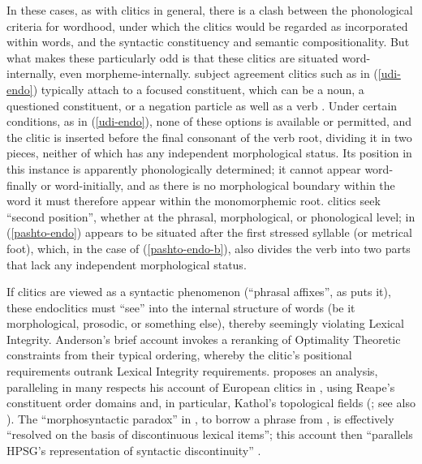 \documentclass[output=paper,biblatex,babelshorthands,newtxmath,draftmode,colorlinks,citecolor=brown]{langscibook}
\begin{document}
In these cases, as with clitics in general, there is a clash between the phonological criteria for wordhood, under which the clitics would be regarded as incorporated within words, and the syntactic constituency and semantic compositionality.
But what makes these particularly odd is that these clitics are situated word-internally, even morpheme-internally.
 subject agreement clitics such as  in (\ref{udi-endo}) typically attach to a focused constituent, which can be a noun, a questioned constituent, or a negation particle as well as a verb \citep{Harris2000}.
Under certain conditions, as in (\ref{udi-endo}), none of these options is available or permitted, and the clitic is inserted before the final consonant of the verb root, dividing it in two pieces, neither of which has any independent morphological status.
Its position in this instance is apparently phonologically determined; it cannot appear word-finally or word-initially, and as there is no morphological boundary within the word it must therefore appear within the monomorphemic root.
 clitics seek ``second position'', whether at the phrasal, morphological, or phonological level;  in (\ref{pashto-endo}) appears to be situated after the first stressed syllable (or metrical foot), which, in the case of (\ref{pashto-endo-b}), also divides the verb into two parts that lack any independent morphological status.

If clitics are viewed as a syntactic phenomenon (``phrasal affixes'', as \citealt{Anderson2005} puts
it), these endoclitics must ``see'' into the internal structure of words (be it morphological,
prosodic, or something else), thereby seemingly violating Lexical
Integrity. Anderson's brief account invokes a reranking of Optimality Theoretic constraints from
their typical ordering, whereby the clitic's positional requirements outrank Lexical Integrity
requirements. \citet{Crysmann2000b} proposes an analysis, paralleling in many respects his account
of European  clitics in \citet{Crysmann2000a}, using Reape's constituent
order domains \citep{Reape1994} and, in particular, Kathol's topological
fields
(\citealt{Kathol2000a}; see also ). The ``morphosyntactic paradox'' in , to borrow
a phrase from \citet[]{Crysmann2003d}, is effectively ``resolved on the basis of discontinuous lexical items''; this account then ``parallels HPSG's representation of syntactic discontinuity'' \citep{Crysmann2000b}.
\end{document}
